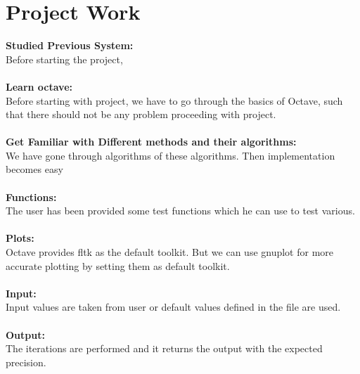 \section{Project Work} 
\textbf{Studied Previous System:}\\
Before starting the project, \\\\
\textbf{Learn octave:}\\
Before starting with project, we have to go through the basics of Octave, such that there
should not be any problem proceeding with project.\\\\
\textbf{Get Familiar with Different methods and their algorithms:}\\
We have gone through algorithms of these algorithms. Then implementation becomes easy\\\\
\textbf{Functions:}\\
The user has been provided some test functions which he can use to test various.\\\\
\textbf{Plots:}\\
Octave provides fltk as the default toolkit. But we can use gnuplot for more accurate plotting by setting them as default toolkit.\\\\
\textbf{Input:}\\
Input values are taken from user or default values defined in the file are used.\\\\
\textbf{Output:}\\
The iterations are performed and it returns the output with the expected precision.\\\\


